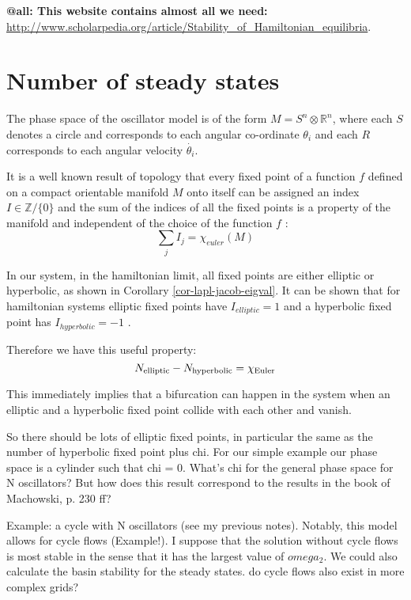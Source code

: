 \documentclass[10pt,aps,pra,twocolumn,superscriptaddress]{revtex4-1}
\begin{document}
\textbf{@all: This website contains almost all we need:} 
\url{http://www.scholarpedia.org/article/Stability_of_Hamiltonian_equilibria}. 


\section{Number of steady states}
The phase space of the oscillator model is of the form 
$M=S^{n}\otimes\mathbb{R}^{n}$, where each $S$ denotes a circle and corresponds to 
each angular co-ordinate $\theta_i$ and each $R$ corresponds to each angular 
velocity $\dot{\theta_i}$. 

It is a well known result of topology that every 
fixed point of a function $f$ defined on a compact orientable
 manifold $M$ onto itself can be
assigned an index $I\in\mathbb{Z}/\{0\}$ and the sum of the indices of all the 
fixed points is a property of the manifold and independent of the choice of 
the function $f$ \cite{arnol1992ordinary,dieck2008algebraic}:  
\[
\underset{j}{\sum}I_{j}=\chi_{euler}(M)
\]

In our system, in the hamiltonian limit, all fixed points are either elliptic 
or hyperbolic, as shown in Corollary \ref{cor-lapl-jacob-eigval}. 
It can be shown that for hamiltonian systems 
elliptic fixed points have $I_{elliptic}=1$ and a hyperbolic fixed point has 
$I_{hyperbolic}=-1$ \cite{meyer1992introduction}.

Therefore we have this useful property:
\begin{equation}
\label{eq-euler-char]}
N_{\rm elliptic} - N_{\rm hyperbolic} = \chi_{\rm Euler}
\end{equation}

This immediately implies that a bifurcation can happen in the system when an 
elliptic and a hyperbolic fixed point collide with each other and vanish.


So there should be lots of elliptic fixed points, in particular the same as the number of hyperbolic fixed point plus chi. For our simple example our phase space is a cylinder such that chi = 0. What's chi for the general phase space for N oscillators? But how does this result correspond to the results in the book of Machowski, p. 230 ff? 

Example: a cycle with N oscillators (see my previous notes). Notably, this model allows for cycle flows (Example!). I suppose that the solution without cycle flows is most stable in the sense that it has the largest value of $omega_2$. We could also calculate the basin stability for the steady states. do cycle flows also exist in more complex grids?
\end{document}
